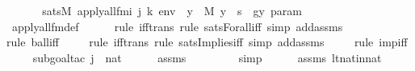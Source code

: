 \begin{isabellebody}
%
\isadelimproof
%
\endisadelimproof
%
\isatagproof
{}\isamarkupfalse%
\ {\isacharminus}{\kern0pt}\ \isanewline
\ \ \isamarkupfalse%
\ {\isachardoublequoteopen}sats{\isacharparenleft}{\kern0pt}M{\isacharcomma}{\kern0pt}\ apply{\isacharunderscore}{\kern0pt}all{\isacharunderscore}{\kern0pt}{}{\isacharunderscore}{\kern0pt}fm{\isacharparenleft}{\kern0pt}i{\isacharcomma}{\kern0pt}\ j{\isacharcomma}{\kern0pt}\ k{\isacharparenright}{\kern0pt}{\isacharcomma}{\kern0pt}\ env{\isacharparenright}{\kern0pt}\ {\isasymlongleftrightarrow}\ {\isacharparenleft}{\kern0pt}{\isasymforall}y\ {\isasymin}\ M{\isachardot}{\kern0pt}\ y\ {\isasymin}\ s\ {\isasymlongrightarrow}\ g{\isacharbackquote}{\kern0pt}{\isacharless}{\kern0pt}y{\isacharcomma}{\kern0pt}\ param{\isachargreater}{\kern0pt}\ {\isacharequal}{\kern0pt}\ {}{\isacharparenright}{\kern0pt}{\isachardoublequoteclose}\ \isanewline
\ \ \ \ \isamarkupfalse%
\ apply{\isacharunderscore}{\kern0pt}all{\isacharunderscore}{\kern0pt}{}{\isacharunderscore}{\kern0pt}fm{\isacharunderscore}{\kern0pt}def\ \isanewline
\ \ \ \ \isamarkupfalse%
{\isacharparenleft}{\kern0pt}rule\ iff{\isacharunderscore}{\kern0pt}trans{\isacharcomma}{\kern0pt}\ rule\ sats{\isacharunderscore}{\kern0pt}Forall{\isacharunderscore}{\kern0pt}iff{\isacharcomma}{\kern0pt}\ simp\ add{\isacharcolon}{\kern0pt}assms{\isacharparenright}{\kern0pt}\isanewline
\ \ \ \ \isamarkupfalse%
{\isacharparenleft}{\kern0pt}rule\ ball{\isacharunderscore}{\kern0pt}iff{\isacharparenright}{\kern0pt}\isanewline
\ \ \ \ \isamarkupfalse%
{\isacharparenleft}{\kern0pt}rule\ iff{\isacharunderscore}{\kern0pt}trans{\isacharcomma}{\kern0pt}\ rule\ sats{\isacharunderscore}{\kern0pt}Implies{\isacharunderscore}{\kern0pt}iff{\isacharcomma}{\kern0pt}\ simp\ add{\isacharcolon}{\kern0pt}assms{\isacharparenright}{\kern0pt}\isanewline
\ \ \ \ \isamarkupfalse%
{\isacharparenleft}{\kern0pt}rule\ imp{\isacharunderscore}{\kern0pt}iff{\isacharparenright}{\kern0pt}\isanewline
\ \ \ \ \isamarkupfalse%
{\isacharparenleft}{\kern0pt}subgoal{\isacharunderscore}{\kern0pt}tac\ {\isachardoublequoteopen}j\ {\isasymin}\ nat{\isachardoublequoteclose}{\isacharparenright}{\kern0pt}\isanewline
\ \ \ \ \isamarkupfalse%
\ assms\ \isanewline
\ \ \ \ \ \ \isamarkupfalse%
\ simp\isanewline
\ \ \ \ \isamarkupfalse%
\ assms\ lt{\isacharunderscore}{\kern0pt}nat{\isacharunderscore}{\kern0pt}in{\isacharunderscore}{\kern0pt}nat\ \isanewline

\end{isabellebody}
